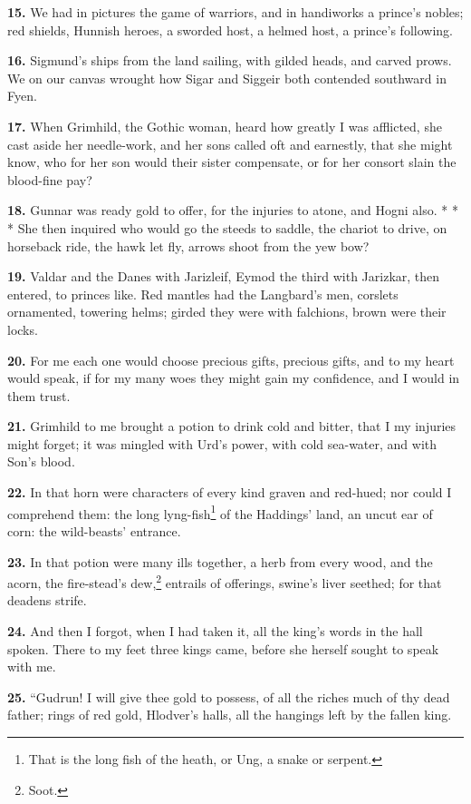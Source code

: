 \textbf{15.} We had in pictures the game of warriors, and in handiworks a
prince's nobles; red shields, Hunnish heroes, a sworded host, a helmed
host, a prince's following.

\textbf{16.} Sigmund's ships from the land sailing, with gilded heads, and
carved prows. We on our canvas wrought how Sigar and Siggeir both
contended southward in Fyen.

\textbf{17.} When Grimhild, the Gothic woman, heard how greatly I was
afflicted, she cast aside her needle-work, and her sons called oft and
earnestly, that she might know, who for her son would their sister
compensate, or for her consort slain the blood-fine pay?

\textbf{18.} Gunnar was ready gold to offer, for the injuries to atone, and
Hogni also. * * * She then inquired who would go the steeds to saddle,
the chariot to drive, on horseback ride, the hawk let fly, arrows
shoot from the yew bow?

\textbf{19.} Valdar and the Danes with Jarizleif, Eymod the third with
Jarizkar, then entered, to princes like. Red mantles had the
Langbard's men, corslets ornamented, towering helms; girded they were
with falchions, brown were their locks.

\textbf{20.} For me each one would choose precious gifts, precious gifts, and
to my heart would speak, if for my many woes they might gain my
confidence, and I would in them trust.

\textbf{21.} Grimhild to me brought a potion to drink cold and bitter, that I
my injuries might forget; it was mingled with Urd's power, with cold
sea-water, and with Son's blood.

\textbf{22.} In that horn were characters of every kind graven and red-hued;
nor could I comprehend them: the long lyng-fish\footnote{That is the long fish of the heath, or Ung, a snake or
serpent.} of the Haddings'
land, an uncut ear of corn: the wild-beasts' entrance.

\textbf{23.} In that potion were many ills together, a herb from every wood,
and the acorn, the fire-stead's dew,\footnote{Soot.} entrails of offerings,
swine's liver seethed; for that deadens strife.

\textbf{24.} And then I forgot, when I had taken it, all the king's words in
the hall spoken. There to my feet three kings came, before she herself
sought to speak with me.

\textbf{25.} ``Gudrun! I will give thee gold to possess, of all the riches
much of thy dead father; rings of red gold, Hlodver's halls, all the
hangings left by the fallen king.

